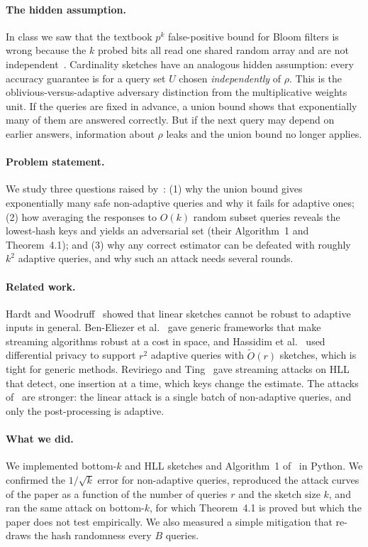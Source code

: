 \documentclass{cccg20}
\begin{document}
\paragraph{The hidden assumption.}
In class we saw that the textbook $p^k$ false-positive bound for Bloom filters is wrong because the $k$ probed bits all read one shared random array and are not independent~\cite{bose2008}. Cardinality sketches have an analogous hidden assumption: every accuracy guarantee is for a query set $U$ chosen \emph{independently} of $\rho$. This is the oblivious-versus-adaptive adversary distinction from the multiplicative weights unit. If the queries are fixed in advance, a union bound shows that exponentially many of them are answered correctly. But if the next query may depend on earlier answers, information about $\rho$ leaks and the union bound no longer applies.

\paragraph{Problem statement.}
We study three questions raised by~\cite{ahmadian2024}: (1) why the union bound gives exponentially many safe non-adaptive queries and why it fails for adaptive ones; (2) how averaging the responses to $O(k)$ random subset queries reveals the lowest-hash keys and yields an adversarial set (their Algorithm~1 and Theorem~4.1); and (3) why any correct estimator can be defeated with roughly $k^2$ adaptive queries, and why such an attack needs several rounds.

\paragraph{Related work.}
Hardt and Woodruff~\cite{hardt2013} showed that linear sketches cannot be robust to adaptive inputs in general. Ben-Eliezer et al.~\cite{beneliezer2020} gave generic frameworks that make streaming algorithms robust at a cost in space, and Hassidim et al.~\cite{hassidim2020} used differential privacy to support $r^2$ adaptive queries with $\tilde O(r)$ sketches, which is tight for generic methods. Reviriego and Ting~\cite{reviriego2020} gave streaming attacks on HLL that detect, one insertion at a time, which keys change the estimate. The attacks of~\cite{ahmadian2024} are stronger: the linear attack is a single batch of non-adaptive queries, and only the post-processing is adaptive.

\paragraph{What we did.}
We implemented bottom-$k$ and HLL sketches and Algorithm~1 of~\cite{ahmadian2024} in Python. We confirmed the $1/\sqrt{k}$ error for non-adaptive queries, reproduced the attack curves of the paper as a function of the number of queries $r$ and the sketch size $k$, and ran the same attack on bottom-$k$, for which Theorem~4.1 is proved but which the paper does not test empirically. We also measured a simple mitigation that re-draws the hash randomness every $B$ queries.
\end{document}
